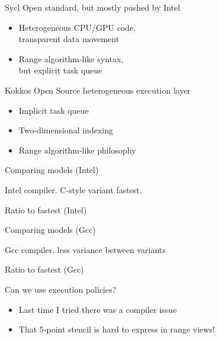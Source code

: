 \documentclass[10pt]{beamer}
\begin{document}
\begin{frame}[containsverbatim]{}
\end{frame}

\begin{frame}[containsverbatim]{Sycl}
  Open standard, but mostly pushed by Intel
  \begin{itemize}
  \item Heterogeneous CPU/GPU code,\\
    transparent data movement
  \item Range algorithm-like syntax,\\
    but explicit task queue
  \end{itemize}
\end{frame}

\begin{frame}[containsverbatim]{Kokkos}
  Open Source heterogeneous execution layer
  \begin{itemize}
  \item Implicit task queue
  \item Two-dimensional indexing
  \item Range algorithm-like philosophy
  \end{itemize}
\end{frame}

\begin{frame}[containsverbatim]{Comparing models (Intel)}
  

  Intel compiler. C-style variant fastest.
\end{frame}

\begin{frame}[containsverbatim]{Ratio to fastest (Intel)}
  
\end{frame}

\begin{frame}[containsverbatim]{Comparing models (Gcc)}
  

  Gcc compiler. less variance between variants
\end{frame}

\begin{frame}[containsverbatim]{Ratio to fastest (Gcc)}
  
\end{frame}

\begin{frame}[containsverbatim]{Can we use execution policies?}
  \begin{itemize}
  \item Last time I tried there was a compiler issue
  \item That 5-point stencil is hard to express in range views!
  \end{itemize}
\end{frame}
\end{document}
